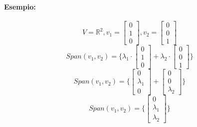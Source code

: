 \documentclass[12pt,a4paper]{article}
\begin{document}
\paragraph{Esempio:}
\[
V = \mathbb{R}^2, v_1 = \begin{bmatrix}
  0\\
  1\\
  0
\end{bmatrix}, v_2 = \begin{bmatrix}
  0\\
  0\\
  1
\end{bmatrix}
\]
\[
Span(v_1,v_2) = \{\lambda_1 \cdot \begin{bmatrix}
  0\\
  1\\
  0
\end{bmatrix} + \lambda_2 \cdot \begin{bmatrix}
  0\\
  0\\
  1
\end{bmatrix}\}
\]
\[
Span(v_1,v_2) = \{\begin{bmatrix}
  0\\
  \lambda_1\\
  0
\end{bmatrix} + \begin{bmatrix}
  0\\
  0\\
  \lambda_2
\end{bmatrix}\}
\]
\[
Span(v_1,v_2) = \{\begin{bmatrix}
  0\\
  \lambda_1\\
  \lambda_2
\end{bmatrix}\}
\]
\end{document}
